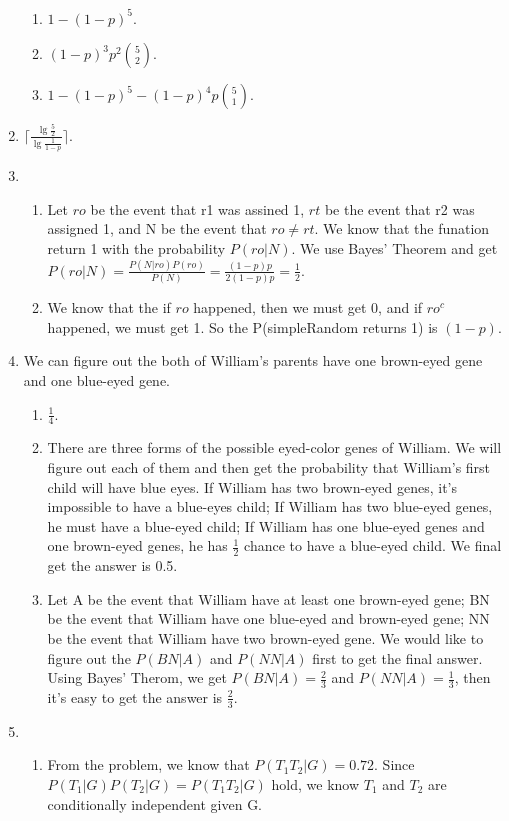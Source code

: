 \documentclass{article}
\begin{document}
\begin{enumerate}
	\begin{enumerate}
	\item $1-(1-p)^5$.
	\item $(1-p)^3 p^2  {5 \choose 2}$.
	\item $1-(1-p)^5-(1-p)^4 p{5\choose1}$.
	\end{enumerate}
	\item $\lceil \frac{\lg\frac{5}{2}}{\lg\frac{1}{1-p}} \rceil $.
	\newpage
	\item \begin{enumerate}
	\item Let $ro$ be the event that r1 was assined 1, $rt$ be the event that r2 was assigned 1, and N be the event that $ro\neq rt$. We know that the funation return 1 with the probability $P(ro|N)$. We use Bayes' Theorem and get $P(ro|N)=\frac{P(N|ro)P(ro)}{P(N)}=\frac{(1-p)p}{2(1-p)p}=\frac{1}{2}$.
	\item We know that the if $ro$ happened, then we must get 0, and if $ro^c$ happened, we must get 1. So the P(simpleRandom returns 1) is $(1-p)$.
	\end{enumerate}
	\item We can figure out the both of William's parents have one brown-eyed gene and one blue-eyed gene.
	\begin{enumerate}
	\item $\frac{1}{4}$.
	\item There are three forms of the possible eyed-color genes of William. We will figure out each of them and then get the probability that William's first child will have blue eyes. If William has two brown-eyed genes, it's impossible to have a blue-eyes child; If William has two blue-eyed genes, he must have a blue-eyed child; If William has one blue-eyed genes and one brown-eyed genes, he has $\frac{1}{2}$ chance to have a blue-eyed child. We final get the answer is 0.5.
	\item Let A be the event that William have at least one brown-eyed gene; BN be the event that William have one blue-eyed and brown-eyed gene; NN be the event that William have two brown-eyed gene.  We would like to figure out the $P(BN|A)$ and $P(NN|A)$ first to get the final answer. Using Bayes' Therom, we get $P(BN|A)=\frac{2}{3}$ and $P(NN|A)=\frac{1}{3}$, then it's easy to get the answer is $\frac{2}{3}$.
	\end{enumerate}
	\item \begin{enumerate}
	\item From the problem, we know that $P(T_1 T_2 | G)=0.72$. Since $P(T_1 |G)P(T_2 |G)=P(T_1 T_2 | G)$ hold, we know $T_1$ and $T_2$ are conditionally independent given G.

\end{enumerate}
\end{enumerate}
\end{document}
